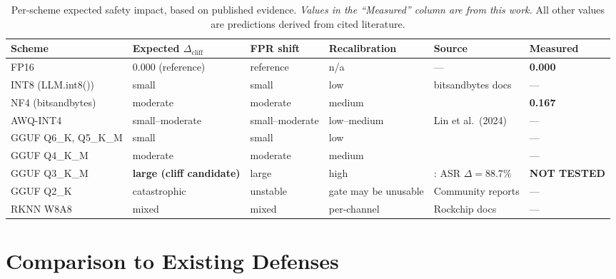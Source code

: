 \documentclass[11pt,a4paper]{article}
\newcommand{\cliff}{\Delta_{\mathrm{cliff}}}
\begin{document}
\begin{table}[H]
  \centering
  \small
  \caption{Per-scheme expected safety impact, based on published evidence.
           \emph{Values in the ``Measured'' column are from this work.}
           All other values are predictions derived from cited literature.}
  \label{tab:quant_impact}
  \begin{tabularx}{\textwidth}{@{}lXXXlX@{}}
    \toprule
    Scheme & Expected $\cliff$ & FPR shift & Recalibration & Source & \textbf{Measured} \\
    \midrule
    FP16 & 0.000 (reference) & reference & n/a & --- & \textbf{0.000} \\
    INT8 (LLM.int8()) & small & small & low & bitsandbytes docs & --- \\
    NF4 (bitsandbytes) & moderate & moderate & medium & \citet{hong2024quant} & \textbf{0.167} \\
    AWQ-INT4 & small--moderate & small--moderate & low--medium & Lin et al.\ (2024) & --- \\
    GGUF Q6\_K, Q5\_K\_M & small & small & low & \citet{mindthegap2025} & --- \\
    GGUF Q4\_K\_M & moderate & moderate & medium & \citet{egashira2024exploiting} & --- \\
    GGUF Q3\_K\_M & \textbf{large (cliff candidate)} & large & high & \citet{egashira2024exploiting}: ASR $\Delta = 88.7\%$ & \textbf{NOT TESTED} \\
    GGUF Q2\_K & catastrophic & unstable & gate may be unusable & Community reports & --- \\
    RKNN W8A8 & mixed & mixed & per-channel & Rockchip docs & --- \\
    \bottomrule
  \end{tabularx}
\end{table}

\section{Comparison to Existing Defenses}
\label{sec:comparison}
\end{document}

